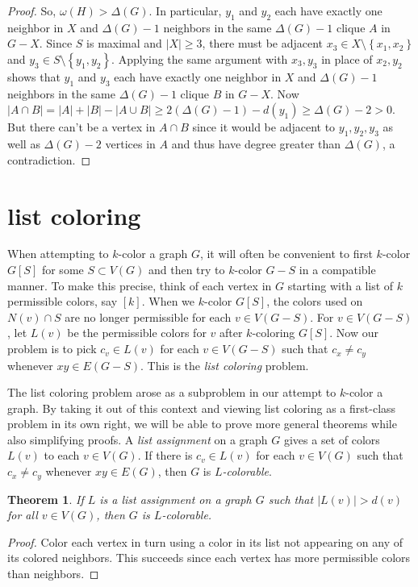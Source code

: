 \documentclass{amsbook}
\theoremstyle{plain}
\newtheorem{theorem}{Theorem}
\numberwithin{equation}{chapter}
\newcommand{\set}[1]{\left\{ #1 \right\}}
\newcommand{\card}[1]{\left|#1\right|}
\newcommand{\irange}[1]{\left[#1\right]}
\begin{document}
\begin{proof}
So, $\omega(H) > \Delta(G)$.  In particular, $y_1$ and $y_2$ each have exactly one neighbor in $X$ and $\Delta(G) - 1$ neighbors in the same $\Delta(G) -1$ clique $A$ in $G - X$.
 Since $S$ is maximal and $\card{X} \ge 3$, there must be adjacent
$x_3 \in X \setminus \set{x_1,x_2}$ and $y_3 \in S \setminus \set{y_1,y_2}$.  Applying the same argument with $x_3, y_3$ in place of $x_2, y_2$ shows
that $y_1$ and $y_3$ each have exactly one neighbor in $X$ and $\Delta(G) - 1$ neighbors in the same $\Delta(G) -1$ clique $B$ in $G - X$.
Now $\card{A\cap B} = \card{A} + \card{B} - \card{A\cup B} \ge 2(\Delta(G) - 1) - d(y_1) \ge \Delta(G) - 2 > 0$.  But there can't be a vertex
in $A \cap B$ since it would be adjacent to $y_1,y_2,y_3$ as well as $\Delta(G) - 2$ vertices in $A$ and thus have degree greater than $\Delta(G)$, a contradiction. 
\end{proof}

\section*{list coloring}
When attempting to $k$-color a graph $G$, it will often be convenient to first $k$-color $G[S]$ for some $S \subset V(G)$ and then try to 
$k$-color $G-S$ in a compatible manner. To make this precise, think of each vertex in $G$ starting with a list of $k$ permissible colors, say $\irange{k}$.
When we $k$-color $G[S]$, the colors used on $N(v) \cap S$ are no longer permissible for each $v \in V(G-S)$.  For $v \in V(G-S)$, let $L(v)$ be the permissible colors
for $v$ after $k$-coloring $G[S]$.  Now our problem is to pick $c_v \in L(v)$ for each $v \in V(G-S)$ such that $c_x \ne c_y$ whenever $xy \in E(G-S)$.  This is the
\emph{list coloring} problem.

The list coloring problem arose as a subproblem in our attempt to $k$-color a graph.  By taking it out of this context and viewing list coloring as a first-class problem in its own
right, we will be able to prove more general theorems while also simplifying proofs.  A \emph{list assignment} on a graph $G$ gives a set of colors $L(v)$ to each $v \in V(G)$.  
If there is $c_v \in L(v)$ for each $v \in V(G)$ such that $c_x \ne c_y$ whenever $xy \in E(G)$, then $G$ is \emph{$L$-colorable}.

\begin{theorem}\label{FirstListBound}
If $L$ is a list assignment on a graph $G$ such that $\card{L(v)} > d(v)$ for all $v \in V(G)$, then $G$ is $L$-colorable.
\end{theorem}
\begin{proof}
Color each vertex in turn using a color in its list not appearing on any of its colored neighbors.  
This succeeds since each vertex has more permissible colors than neighbors.
\end{proof}
\end{document}
